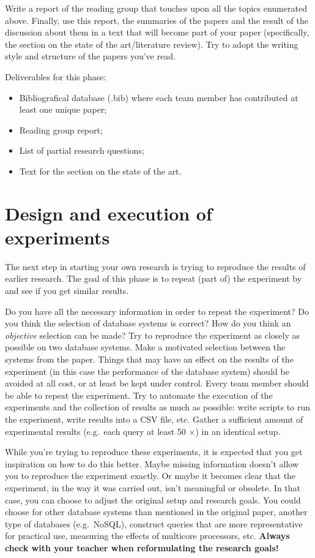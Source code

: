\documentclass[fleqn,10pt]{artikeltin}
\begin{document}
Write a report of the reading group that touches upon all the topics enumerated above. Finally, use this report, the summaries of the papers and the result of the discussion about them in a text that will become part of your paper (specifically, the section on the state of the art/literature review). Try to adopt the writing style and structure of the papers you've read.

Deliverables for this phase:

\begin{itemize}
	\item Bibliografical database (.bib) where each team member has contributed at least one unique paper;
	\item Reading group report;
	\item List of partial research questions;
	\item Text for the section on the state of the art.
\end{itemize}

\section{Design and execution of experiments}
\label{sec:experiments}

The next step in starting your own research is trying to reproduce the results of earlier research. The goal of this phase is to repeat (part of) the experiment by~\textcite{Bassil2012} and see if you get similar results.

Do you have all the necessary information in order to repeat the experiment? Do you think the selection of database systems is correct? How do you think an \emph{objective} selection can be made? Try to reproduce the experiment as closely as possible on two database systems. Make a motivated selection between the systems from the paper. Things that may have an effect on the results of the experiment (in this case the performance of the database system) should be avoided at all cost, or at least be kept under control. Every team member should be able to repeat the experiment. Try to automate the execution of the experiments and the collection of results as much as possible: write scripts to run the experiment, write results into a CSV file, etc. Gather a sufficient amount of experimental results (e.g.~each query at least 50 $\times$) in an identical setup.

While you're trying to reproduce these experiments, it is expected that you get inspiration on how to do this better. Maybe missing information doesn't allow you to reproduce the experiment exactly. Or maybe it becomes clear that the experiment, in the way it was carried out, isn't meaningful or obsolete. In that case, you can choose to adjust the original setup and research goals. You could choose for other database systems than mentioned in the original paper, another type of databases (e.g.~NoSQL), construct queries that are more representative for practical use, measuring the effects of multicore processors, etc. \textbf{Always check with your teacher when reformulating the research goals!}
\end{document}
